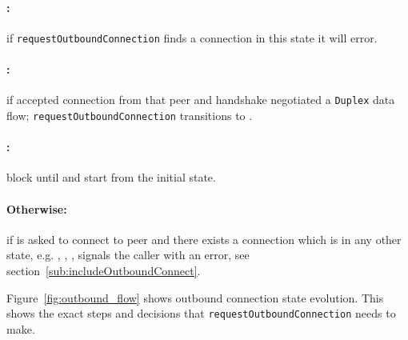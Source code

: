 \paragraph{\InboundStateUni{}:} if \texttt{requestOutboundConnection} finds
a connection in this state it will error.

\paragraph{\InboundStateDup{}:} if \connmngr{} accepted connection from
  that peer and handshake negotiated a \texttt{Duplex} data flow;
  \texttt{requestOutboundConnection} transitions to \DuplexState{}.

\paragraph{\TerminatingState{}:} block until \TerminatedState{} and start from
the initial state.

\paragraph{\textnormal{Otherwise}:} if \connmngr{} is asked to connect to
peer and there exists a connection which is in any other state, e.g.
\UnnegotiatedStateOut{}, \OutboundStateAny{}, \DuplexState{}, \connmngr{} signals the caller with an error, see
section~\ref{sub:includeOutboundConnect}.

Figure~\ref{fig:outbound_flow} shows outbound connection state evolution.  This
shows the exact steps and decisions that \texttt{requestOutboundConnection}
needs to make.

